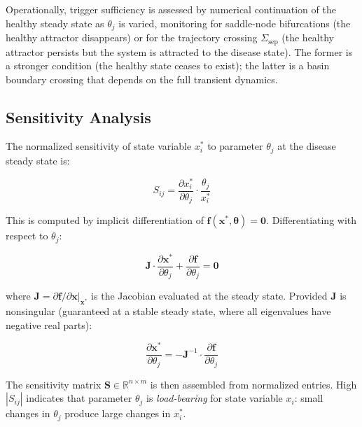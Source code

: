 Operationally, trigger sufficiency is assessed by numerical continuation of the healthy steady state as $\theta_j$ is varied, monitoring for saddle-node bifurcations (the healthy attractor disappears) or for the trajectory crossing $\Sigma_{\mathrm{sep}}$ (the healthy attractor persists but the system is attracted to the disease state). The former is a stronger condition (the healthy state ceases to exist); the latter is a basin boundary crossing that depends on the full transient dynamics.

\subsection{Sensitivity Analysis}
\label{sec:sensitivity-method}

The normalized sensitivity of state variable $x_i^*$ to parameter $\theta_j$ at the disease steady state is:

\begin{equation}
\label{eq:normalized-sensitivity}
S_{ij} = \frac{\partial x_i^*}{\partial \theta_j} \cdot \frac{\theta_j}{x_i^*}
\end{equation}

This is computed by implicit differentiation of $\mathbf{f}(\mathbf{x}^*, \boldsymbol{\theta}) = \mathbf{0}$. Differentiating with respect to $\theta_j$:

\begin{equation}
\label{eq:implicit-differentiation}
\mathbf{J} \cdot \frac{\partial \mathbf{x}^*}{\partial \theta_j} + \frac{\partial \mathbf{f}}{\partial \theta_j} = \mathbf{0}
\end{equation}

where $\mathbf{J} = \partial \mathbf{f}/\partial \mathbf{x}|_{\mathbf{x}^*}$ is the Jacobian evaluated at the steady state. Provided $\mathbf{J}$ is nonsingular (guaranteed at a stable steady state, where all eigenvalues have negative real parts):

\begin{equation}
\label{eq:sensitivity-solution}
\frac{\partial \mathbf{x}^*}{\partial \theta_j} = -\mathbf{J}^{-1} \cdot \frac{\partial \mathbf{f}}{\partial \theta_j}
\end{equation}

The sensitivity matrix $\mathbf{S} \in \mathbb{R}^{n \times m}$ is then assembled from normalized entries. High $|S_{ij}|$ indicates that parameter $\theta_j$ is \emph{load-bearing} for state variable $x_i$: small changes in $\theta_j$ produce large changes in $x_i^*$.

